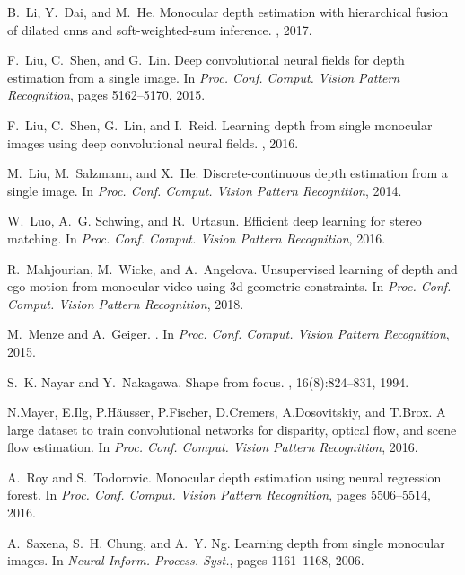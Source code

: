 \documentclass[10pt,twocolumn,letterpaper]{article}
\begin{document}
{\begin{thebibliography}{10}
B.~Li, Y.~Dai, and M.~He.
\newblock Monocular depth estimation with hierarchical fusion of dilated cnns
  and soft-weighted-sum inference.
, 2017.

F.~Liu, C.~Shen, and G.~Lin.
\newblock Deep convolutional neural fields for depth estimation from a single
  image.
\newblock In {\em Proc. Conf. Comput. Vision Pattern Recognition}, pages
  5162--5170, 2015.

F.~Liu, C.~Shen, G.~Lin, and I.~Reid.
\newblock Learning depth from single monocular images using deep convolutional
  neural fields.
, 2016.

M.~Liu, M.~Salzmann, and X.~He.
\newblock Discrete-continuous depth estimation from a single image.
\newblock In {\em Proc. Conf. Comput. Vision Pattern Recognition}, 2014.

W.~Luo, A.~G. Schwing, and R.~Urtasun.
\newblock Efficient deep learning for stereo matching.
\newblock In {\em Proc. Conf. Comput. Vision Pattern Recognition}, 2016.

R.~Mahjourian, M.~Wicke, and A.~Angelova.
\newblock Unsupervised learning of depth and ego-motion from monocular video
  using 3d geometric constraints.
\newblock In {\em Proc. Conf. Comput. Vision Pattern Recognition}, 2018.

M.~Menze and A.~Geiger.
.
\newblock In {\em Proc. Conf. Comput. Vision Pattern Recognition}, 2015.

S.~K. Nayar and Y.~Nakagawa.
\newblock Shape from focus.
, 16(8):824--831, 1994.

N.Mayer, E.Ilg, P.H{\"a}usser, P.Fischer, D.Cremers, A.Dosovitskiy, and T.Brox.
\newblock A large dataset to train convolutional networks for disparity,
  optical flow, and scene flow estimation.
\newblock In {\em Proc. Conf. Comput. Vision Pattern Recognition}, 2016.

A.~Roy and S.~Todorovic.
\newblock Monocular depth estimation using neural regression forest.
\newblock In {\em Proc. Conf. Comput. Vision Pattern Recognition}, pages
  5506--5514, 2016.

A.~Saxena, S.~H. Chung, and A.~Y. Ng.
\newblock Learning depth from single monocular images.
\newblock In {\em Neural Inform. Process. Syst.}, pages 1161--1168, 2006.


\end{thebibliography}}
\end{document}
